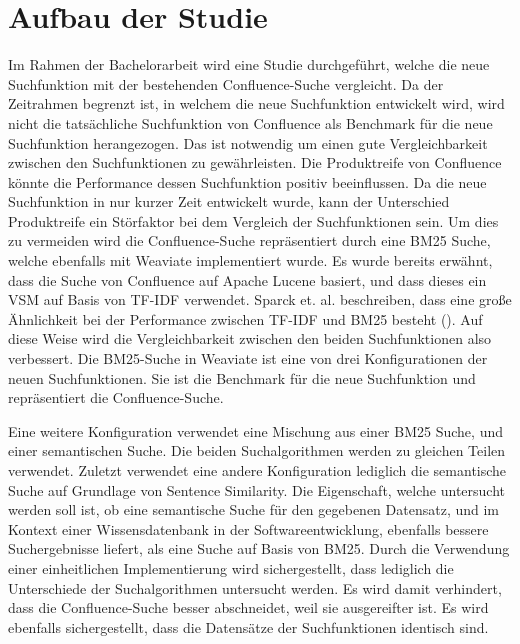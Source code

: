 \section{Aufbau der Studie}
\label{chap:aufbau-der-studie}
Im Rahmen der Bachelorarbeit wird eine Studie durchgeführt, welche die neue Suchfunktion mit der bestehenden Confluence-Suche vergleicht.
Da der Zeitrahmen begrenzt ist, in welchem die neue Suchfunktion entwickelt wird, wird nicht die tatsächliche Suchfunktion von Confluence als Benchmark für die neue Suchfunktion herangezogen.
Das ist notwendig um einen gute Vergleichbarkeit zwischen den Suchfunktionen zu gewährleisten.
Die Produktreife von Confluence könnte die Performance dessen Suchfunktion positiv beeinflussen.
Da die neue Suchfunktion in nur kurzer Zeit entwickelt wurde, kann der Unterschied Produktreife ein Störfaktor bei dem Vergleich der Suchfunktionen sein.
Um dies zu vermeiden wird die Confluence-Suche repräsentiert durch eine BM25 Suche, welche ebenfalls mit Weaviate implementiert wurde. 
Es wurde bereits erwähnt, dass die Suche von Confluence auf Apache Lucene basiert, und dass dieses ein VSM auf Basis von TF-IDF verwendet.
Sparck et. al. beschreiben, dass eine große Ähnlichkeit bei der Performance zwischen TF-IDF und BM25 besteht (\cite{Sparck_Jones_Walker_Robertson_2000}).
Auf diese Weise wird die Vergleichbarkeit zwischen den beiden Suchfunktionen also verbessert.
Die BM25-Suche in Weaviate ist eine von drei Konfigurationen der neuen Suchfunktionen.
Sie ist die Benchmark für die neue Suchfunktion und repräsentiert die Confluence-Suche.

Eine weitere Konfiguration verwendet eine Mischung aus einer BM25 Suche, und einer semantischen Suche.
Die beiden Suchalgorithmen werden zu gleichen Teilen verwendet.
Zuletzt verwendet eine andere Konfiguration lediglich die semantische Suche auf Grundlage von Sentence Similarity.
Die Eigenschaft, welche untersucht werden soll ist, ob eine semantische Suche für den gegebenen Datensatz, und im Kontext einer Wissensdatenbank in der Softwareentwicklung, ebenfalls bessere Suchergebnisse liefert, als eine Suche auf Basis von BM25.
Durch die Verwendung einer einheitlichen Implementierung wird sichergestellt, dass lediglich die Unterschiede der Suchalgorithmen untersucht werden.
Es wird damit verhindert, dass die Confluence-Suche besser abschneidet, weil sie ausgereifter ist.
Es wird ebenfalls sichergestellt, dass die Datensätze der Suchfunktionen identisch sind.\\

